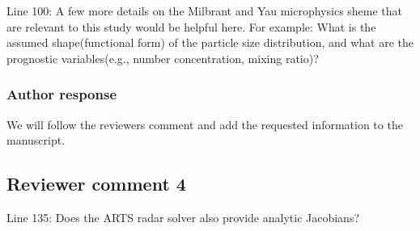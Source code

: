 \documentclass[11pt]{scrartcl}
\providecommand{\DIFadd}[1]{{\protect\textcolor{blue}{\uwave{#1}}}} %
\providecommand{\DIFdel}[1]{{\protect\textcolor{red}{\sout{#1}}}}                      %
\providecommand{\DIFaddbegin}{} %
\providecommand{\DIFaddend}{} %
\providecommand{\DIFdelbegin}{} %
\providecommand{\DIFdelend}{} %
\newenvironment{change}[1][]{%
  \begin{mdframed}[frametitle={Line #1:}]%
}{%
  \end{mdframed}%
}
\begin{document}
\begin{itemize}
Line 100: A few more details on the Milbrant and Yau microphysics sheme that are
relevant to this study would be helpful here. For example: What is the assumed
shape(functional form) of the particle size distribution, and what are the
prognostic variables(e.g., number concentration, mixing ratio)?

\subsubsection*{Author response}

We will follow the reviewers comment and add the requested information
to the manuscript.

%

\subsection*{Reviewer comment 4}
Line 135: Does the ARTS radar solver also provide analytic Jacobians?


\end{itemize}
\end{document}

